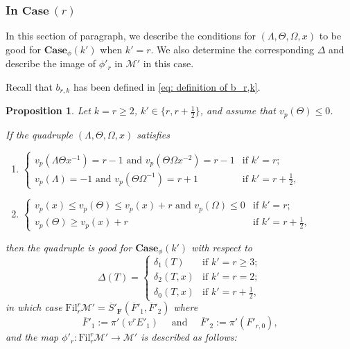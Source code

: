 \documentclass[11pt]{amsart}
\theoremstyle{definition}
\numberwithin{equation}{subsection}
\theoremstyle{plain}
\theoremstyle{plain}
\theoremstyle{plain}
\theoremstyle{plain}
\theoremstyle{plain}
\theoremstyle{plain}
\theoremstyle{plain}
\theoremstyle{plain}
\newtheorem{prop}[equation]{Proposition}
\theoremstyle{plain}
\theoremstyle{plain}
\theoremstyle{plain}
\theoremstyle{plain}
\theoremstyle{definition}
\theoremstyle{definition}
\theoremstyle{definition}
\theoremstyle{remark}
\renewcommand{\(}{\textup{(}}
\renewcommand{\)}{\textup{)}}
\newcommand{\F}{\mathbf{F}}
\newcommand{\barS}{\overline{S}}
\newcommand{\cM}{\mathcal{M}}
\newcommand{\Fil}{\mathrm{Fil}}
\newcommand{\barF}{\overline{F}}
\begin{document}
\subsubsection{\textbf{In $\mathbf{Case}~(r)$}}
In this section of paragraph, we describe the conditions for $(\Lambda,\Theta,\Omega,x)$ to be good for $\mathbf{Case}_\phi(k')$ when $k'=r$. We also determine the corresponding $\Delta$ and describe the image of $\phi'_r$ in $\cM'$ in this case.

Recall that $b_{r,k}$ has been defined in \eqref{eq: definition of b_r,k}.

\begin{prop}\label{prop-cM-Case-r}
Let $k=r\geq 2$, $k'\in\{r,r+\frac{1}{2}\}$, and assume that $v_p(\Theta)\leq 0$.

If the quadruple $(\Lambda,\Theta,\Omega,x)$ satisfies
\begin{enumerate}[leftmargin=*]
      \item $\begin{cases}
               v_p(\Lambda \Theta x^{-1})=r-1\mbox{ and } v_p(\Theta\Omega x^{-2})=r-1 & \mbox{if } k'=r;\\
               v_p(\Lambda)=-1\mbox{ and } v_p(\Theta\Omega^{-1})=r+1 & \mbox{if } k'=r+\frac{1}{2},
             \end{cases}$
      \item $\begin{cases}
               v_p(x)\leq v_p(\Theta)\leq v_p(x)+r\mbox{ and } v_p(\Omega)\leq 0 & \mbox{if } k'=r;\\
               v_p(\Theta)\geq v_p(x)+r & \mbox{if } k'=r+\frac{1}{2},
             \end{cases}$
\end{enumerate}
then the quadruple is good for $\mathbf{Case}_\phi(k')$ with respect to
    \begin{equation*}
        \Delta(T)=
        \begin{cases}
            \delta_1(T) & \mbox{if } k'=r\geq 3;\\
            \delta_2(T,x) & \mbox{if } k'=r=2;\\
            \delta_0(T,x) & \mbox{if } k'=r+\frac{1}{2},
        \end{cases}
    \end{equation*}
in which case $\Fil^r_{r}\cM'=\barS'_\F(\barF'_1,\barF'_2)$ where
    $$\barF'_1:=\pi'(v^rE'_1)\quad\mbox{ and }\quad\barF'_2:=\pi'(F'_{r,0}),$$
and the map $\phi'_r:\Fil^r_{r}\cM'\to \cM'$ is described as follows:
\begin{itemize}[leftmargin=*]

\end{itemize}
\end{prop}
\end{document}
